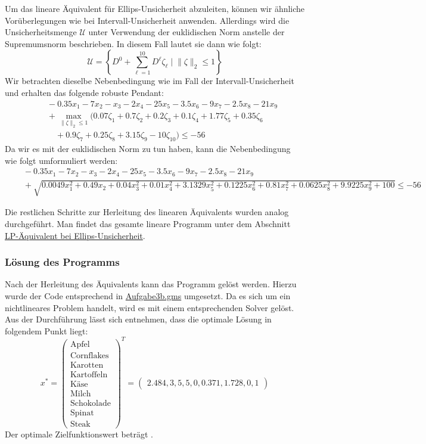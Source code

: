 \documentclass[a4paper,12pt]{article}
\begin{document}
Um das lineare \"Aquivalent f\"ur Ellips-Unsicherheit abzuleiten, k\"onnen wir \"ahnliche Vor\"uberlegungen wie bei Intervall-Unsicherheit anwenden. Allerdings wird die Unsicherheitsmenge $\mathcal{U}$ unter Verwendung der euklidischen Norm anstelle der Supremumsnorm beschrieben. In diesem Fall lautet sie dann wie folgt:
\[
\mathcal{U} = \left\{ D^0 + \sum_{\ell=1}^{10}D^{\ell} \zeta_{\ell} \;\vert\; \|\zeta\|_2 \leq 1 \right\}
\]
Wir betrachten dieselbe Nebenbedingung wie im Fall der Intervall-Unsicherheit und erhalten das folgende robuste Pendant:
\[
\begin{aligned}
    &\quad -0.35x_1 - 7x_2 - x_3 - 2x_4 - 25x_5 - 3.5x_6 - 9x_7 - 2.5x_8 - 21x_9 \\
    &\quad + \max_{\|\zeta\|_2 \leq 1} \big( 0.07\zeta_1 + 0.7\zeta_2 + 0.2\zeta_3 + 0.1\zeta_4 + 1.77\zeta_5 +  0.35\zeta_6\\
    &\qquad + 0.9\zeta_7 + 0.25\zeta_8 + 3.15\zeta_9 - 10\zeta_{10} \big) \leq -56
\end{aligned}
\]
Da wir es mit der euklidischen Norm zu tun haben, kann die Nebenbedingung wie folgt umformuliert werden:
\[
\begin{aligned}
    &\quad -0.35x_1 - 7x_2 - x_3 - 2x_4 - 25x_5 - 3.5x_6 - 9x_7 - 2.5x_8 - 21x_9 \\
    &\quad + \sqrt{0.0049x_1^2 + 0.49x_2 + 0.04x_3^2 + 0.01x_4^2 + 3.1329x_5^2 + 0.1225x_6^2 + 0.81x_7^2 + 0.0625x_8^2 + 9.9225x_9^2 + 100} \leq -56
\end{aligned}
\]

Die restlichen Schritte zur Herleitung des linearen \"Aquivalents wurden analog durchgef\"uhrt. Man findet das gesamte lineare Programm unter dem Abschnitt \hyperref[sec:lp-equivalent-ellips]{LP-\"Aquivalent bei Ellips-Unsicherheit}.

\subsubsection*{L\"osung des Programms}

Nach der Herleitung des \"Aquivalents kann das Programm gel\"ost werden. Hierzu wurde der Code entsprechend in \href{../src/r3/Aufgabe3b.gms}{Aufgabe3b.gms} umgesetzt. Da es sich um ein nichtlineares Problem handelt, wird es mit einem entsprechenden Solver gel\"ost.
Aus der Durchf\"uhrung l\"asst sich entnehmen, dass die optimale L\"osung in folgendem Punkt liegt:
\[
x^* = \begin{pmatrix}
    \text{Apfel} \\ \text{Cornflakes} \\ \text{Karotten} \\ \text{Kartoffeln} \\ \text{K\"ase} \\ \text{Milch} \\ \text{Schokolade} \\ \text{Spinat} \\ \text{Steak}
    \end{pmatrix}^T
     =
     \begin{pmatrix}
     2.484, 3, 5, 5, 0, 0.371, 1.728, 0, 1
        \end{pmatrix}
\]
Der optimale Zielfunktionswert betr\"agt .
\end{document}
